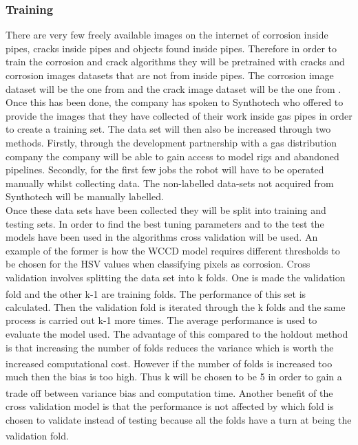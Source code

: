 \documentclass[11pt]{article}		%
\newcommand{\supercite}[1]{\textsuperscript{\cite{#1}}}		%
\begin{document}
        \subsubsection{Training}
	        There are very few freely available images on the internet of corrosion inside pipes, cracks inside pipes and objects found inside pipes. Therefore in order to train the corrosion and crack algorithms they will be pretrained with cracks and corrosion images datasets that are not from inside pipes. The corrosion image dataset will be the one from \cite{WCCD} and the crack image dataset will be the one from \cite{CrackGAN1}.
	        \\
	        Once this has been done, the company has spoken to Synthotech who offered to provide the images that they have collected of their work inside gas pipes in order to create a training set. The data set will then also be increased through two methods. Firstly, through the development partnership with a gas distribution company the company will be able to gain access to model rigs and abandoned pipelines. Secondly, for the first few jobs the robot will have to be operated manually whilst collecting data. The non-labelled data-sets not acquired from Synthotech will be manually labelled.
	        \\
	        Once these data sets have been collected they will be split into training and testing sets. In order to find the best tuning parameters and to the test the models have been used in the algorithms cross validation will be used. An example of the former is how the WCCD model requires different thresholds to be chosen for the HSV values when classifying pixels as corrosion. Cross validation involves splitting the data set into k folds. One is made the validation fold and the other k-1 are training folds.\supercite{Cross_Validation} The performance of this set is calculated. Then the validation fold is iterated through the k folds and the same process is carried out k-1 more times. The average performance is used to evaluate the model used. The advantage of this compared to the holdout method is that increasing the number of folds reduces the variance which is worth the increased computational cost.\supercite{Cross_Validation}\supercite{Cross_Validation2} However if the number of folds is increased too much then the bias is too high. Thus k will be chosen to be 5 in order to gain a trade off between variance bias and computation time.\supercite{Cross_Validation_Tradeoff} Another benefit of the cross validation model is that the performance is not affected by which fold is chosen to validate instead of testing because all the folds have a turn at being the validation fold. \supercite{Cross_Validation}
	        
\end{document}
